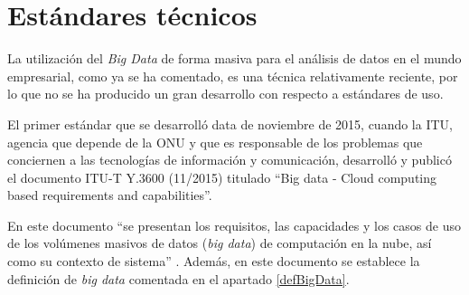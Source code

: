 \clearpage
\section{Estándares técnicos}
La utilización del \textit{Big Data} de forma masiva para el análisis de datos en el mundo empresarial, como ya se ha comentado, es una técnica relativamente reciente, por lo que no se ha producido un gran desarrollo con respecto a estándares de uso.

El primer estándar que se desarrolló data de noviembre de 2015, cuando la \gls{ITU}, agencia que depende de la \gls{ONU} y que es responsable de los problemas que conciernen a las tecnologías de información y comunicación, desarrolló y publicó el documento ITU-T Y.3600 (11/2015) \cite{estandar} titulado ``Big data - Cloud computing based requirements and capabilities''.

En este documento ``se presentan los requisitos, las capacidades y los casos de uso de los volúmenes masivos de datos (\textit{big data}) de computación en la nube, así como su contexto de sistema'' \cite{estandar}. Además, en este documento se establece la definición de \textit{big data} comentada en el apartado \ref{defBigData}.

